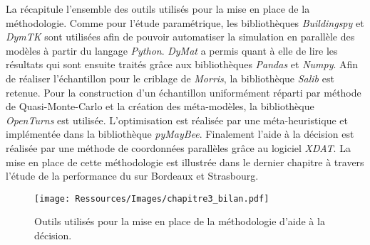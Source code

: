 La  récapitule l’ensemble des outils utilisés pour la
mise en place de la méthodologie. Comme pour l’étude
paramétrique, les bibliothèques \textit{Buildingspy} et \textit{DymTK} sont utilisées
afin de pouvoir automatiser la simulation en parallèle des modèles à partir du langage
\textit{Python}. \textit{DyMat} a permis quant à elle de lire les résultats qui sont
ensuite traités grâce aux bibliothèques \textit{Pandas} et \textit{Numpy}. Afin de réaliser
l’échantillon pour le criblage de \textit{Morris}, la bibliothèque \textit{Salib} est retenue.
Pour la construction d’un échantillon uniformément réparti par méthode de Quasi-Monte-Carlo
et la création des méta-modèles, la bibliothèque \textit{OpenTurns} est utilisée.
L’optimisation est réalisée par une méta-heuristique et implémentée dans la bibliothèque \textit{pyMayBee}.
Finalement l’aide à la décision est réalisée par une méthode de coordonnées
parallèles grâce au logiciel \textit{XDAT}.
La mise en place de cette méthodologie est illustrée dans le dernier chapitre à travers l’étude
de la performance du  sur Bordeaux et Strasbourg.

\begin{figure}
    \centering
    \texttt{[image: Ressources/Images/chapitre3\_bilan.pdf]}
    \caption[Outils utilisés pour la mise en place de la méthodologie d’aide à la décision]
            {Outils utilisés pour la mise en place de la méthodologie d’aide à la décision.}
    \label{fig:outils_methode}
\end{figure}

